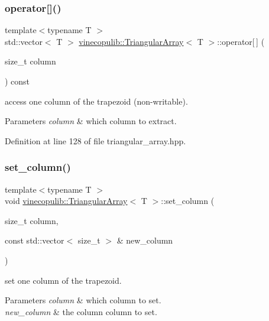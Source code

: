 \subsubsection{\texorpdfstring{operator[]()}{operator[]()}\hspace{0.1cm}{\footnotesize\ttfamily [2/2]}}
{\footnotesize\ttfamily template$<$typename T $>$ \\
std\+::vector$<$ T $>$ \hyperlink{classvinecopulib_1_1_triangular_array}{vinecopulib\+::\+Triangular\+Array}$<$ T $>$\+::operator\mbox{[}$\,$\mbox{]} (\begin{DoxyParamCaption}\item[{size\+\_\+t}]{column }\end{DoxyParamCaption}) const}



access one column of the trapezoid (non-\/writable). 


\begin{DoxyParams}{Parameters}
{\em column} & which column to extract. \\
\hline
\end{DoxyParams}


Definition at line 128 of file triangular\+\_\+array.\+hpp.

\mbox{\label{classvinecopulib_1_1_triangular_array_ae9d39595702831aca33b981ef7687a1d}} 
\subsubsection{\texorpdfstring{set\+\_\+column()}{set\_column()}}
{\footnotesize\ttfamily template$<$typename T $>$ \\
void \hyperlink{classvinecopulib_1_1_triangular_array}{vinecopulib\+::\+Triangular\+Array}$<$ T $>$\+::set\+\_\+column (\begin{DoxyParamCaption}\item[{size\+\_\+t}]{column,  }\item[{const std\+::vector$<$ size\+\_\+t $>$ \&}]{new\+\_\+column }\end{DoxyParamCaption})}



set one column of the trapezoid. 


\begin{DoxyParams}{Parameters}
{\em column} & which column to set. \\
\hline
{\em new\+\_\+column} & the column column to set. \\
\hline
\end{DoxyParams}


